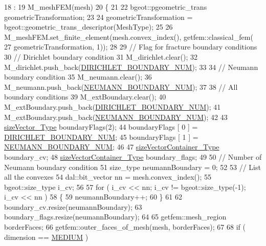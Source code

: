 \begin{DoxyCode}
18                                             :
19     M\_meshFEM(mesh)
20 \{
21 
22     bgeot::pgeometric\_trans geometricTransformation;
23 
24     geometricTransformation = bgeot::geometric\_trans\_descriptor(MeshType);
25 
26     M\_meshFEM.set\_finite\_element(mesh.convex\_index(), getfem::classical\_fem(
27             geometricTransformation, 1));
28 
29     \textcolor{comment}{// Flag for fracture boundary conditions}
30     \textcolor{comment}{// Dirichlet boundary condition}
31     M\_dirichlet.clear();
32     M\_dirichlet.push\_back(\hyperlink{classBC_ad1b507696802f73b95c0ca59f4c41390a99103ccd54ba29b1bd2670cc6cd0c462}{DIRICHLET\_BOUNDARY\_NUM});
33 
34     \textcolor{comment}{// Neumann boundary condition}
35     M\_neumann.clear();
36     M\_neumann.push\_back(\hyperlink{classBC_ad1b507696802f73b95c0ca59f4c41390a432aa77a00d8eb4929463ef8d57b5c04}{NEUMANN\_BOUNDARY\_NUM});
37 
38     \textcolor{comment}{// All boundary conditions}
39     M\_extBoundary.clear();
40     M\_extBoundary.push\_back(\hyperlink{classBC_ad1b507696802f73b95c0ca59f4c41390a99103ccd54ba29b1bd2670cc6cd0c462}{DIRICHLET\_BOUNDARY\_NUM});
41     M\_extBoundary.push\_back(\hyperlink{classBC_ad1b507696802f73b95c0ca59f4c41390a432aa77a00d8eb4929463ef8d57b5c04}{NEUMANN\_BOUNDARY\_NUM});
42 
43     \hyperlink{Core_8h_a83c51913d041a5001e8683434c09857f}{sizeVector\_Type} boundaryFlags(2);
44     boundaryFlags [ 0 ] = \hyperlink{classBC_ad1b507696802f73b95c0ca59f4c41390a99103ccd54ba29b1bd2670cc6cd0c462}{DIRICHLET\_BOUNDARY\_NUM};
45     boundaryFlags [ 1 ] = \hyperlink{classBC_ad1b507696802f73b95c0ca59f4c41390a432aa77a00d8eb4929463ef8d57b5c04}{NEUMANN\_BOUNDARY\_NUM};
46 
47     \hyperlink{Core_8h_a80e8381d86ecb0a7f4f87ff84d1a0be5}{sizeVectorContainer\_Type} boundary\_cv;
48     \hyperlink{Core_8h_a80e8381d86ecb0a7f4f87ff84d1a0be5}{sizeVectorContainer\_Type} boundary\_flags;
49 
50     \textcolor{comment}{// Number of Neumann boundary condition}
51     size\_type neumannBoundary = 0;
52 
53     \textcolor{comment}{// List all the convexes}
54     dal::bit\_vector nn = mesh.convex\_index();
55     bgeot::size\_type i\_cv;
56 
57     \textcolor{keywordflow}{for} ( i\_cv << nn; i\_cv != bgeot::size\_type(-1); i\_cv << nn )
58     \{
59         neumannBoundary++;
60     \}
61 
62     boundary\_cv.resize(neumannBoundary);
63     boundary\_flags.resize(neumannBoundary);
64 
65     getfem::mesh\_region borderFaces;
66     getfem::outer\_faces\_of\_mesh(mesh, borderFaces);
67 
68     \textcolor{keywordflow}{if} ( dimension == \hyperlink{Core_8h_a419d7707e418f02d8daeb1fc7c0b9ae5a5340ec7ecef6cc3886684a3bd3450d64}{MEDIUM} )

\end{DoxyCode}
